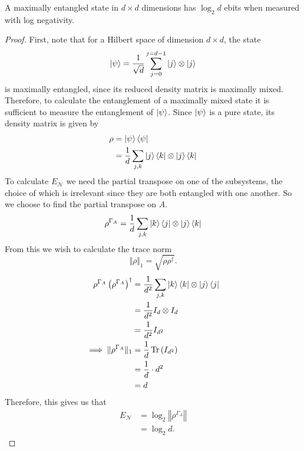 \begin{claim}
    \label{claim:maximally_entangled_states}
    A maximally entangled state in $d\times d$ dimensions has $\log_2d$ ebits when measured with log negativity.
\end{claim}
\begin{proof}
    First, note that for a Hilbert space of dimension $d\times d$, the state
    \begin{equation}
        \ket{\psi} = \frac{1}{\sqrt{d}}\sum_{j=0}^{j=d-1}\ket{j}\otimes\ket{j}
    \end{equation}
    is maximally entangled, since its reduced density matrix is maximally mixed.
    Therefore, to calculate the entanglement of a maximally mixed state it is sufficient to measure the entanglement of $\ket{\psi}$.
    Since $\ket{\psi}$ is a pure state, its density matrix is given by 
    \begin{align}
        \rho &= \ket{\psi}\bra{\psi}\\
        &=\frac{1}{d} \sum_{j,k}\ket{j}\bra{k}\otimes\ket{j}\bra{k}
    \end{align}
    To calculate $E_{\mathcal{N}}$ we need the partial transpose on one of the subsystems, the choice of which is irrelevant since they are both entangled with one another.
    So we choose to find the partial transpose on $A$.
    \begin{align}
        \rho^{\Gamma_A} =\frac{1}{d} \sum_{j,k}\ket{k}\bra{j}\otimes\ket{j}\bra{k}
    \end{align}
    From this we wish to calculate the trace norm 
    \begin{equation}
        \Vert\rho\Vert_1 = \sqrt{\rho\rho^{\dagger}}.
    \end{equation}
    \begin{align}
        \rho^{\Gamma_A}\left(\rho^{\Gamma_A}\right)^{\dagger} &= \frac{1}{d^2} \sum_{j,k}\ket{k}\bra{k}\otimes\ket{j}\bra{j}\\
        &=\frac{1}{d^2}I_d\otimes I_d\\
        &=\frac{1}{d^2}I_{d^2}\\
        \implies \Vert\rho^{\Gamma_A}\Vert_1 &= \frac{1}{d}\operatorname{Tr}{\left(I_{d^2}\right)}\\
        &= \frac{1}{d}\cdot d^2\\
        &= d
    \end{align}
    Therefore, this gives us that
    \begin{align}
        E_{\mathcal{N}} &= \log_2\left\Vert \rho^{\Gamma_A}\right\Vert\\
        &= \log_2d.
    \end{align}
\end{proof}